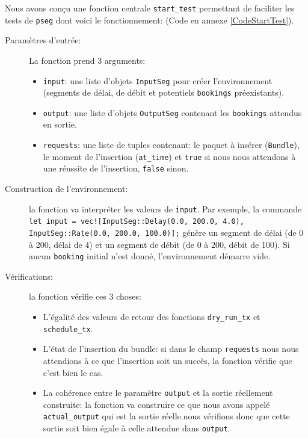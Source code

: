 \documentclass{article}
\begin{document}
Nous avons conçu une fonction centrale \texttt{start\_test} permettant de faciliter les tests de \texttt{pseg} dont voici le fonctionnement: \label{pseg} (Code en annexe \ref{CodeStartTest}).
\begin{description}
    \item[Paramètres d'entrée: ] La fonction prend 3 arguments:
    \begin{itemize}
        \item \texttt{input}: une liste d'objets \texttt{InputSeg} pour créer l'environnement (segments de délai, de débit et potentiels \texttt{bookings} préexistants).
        \item \texttt{output}: une liste d'objets \texttt{OutputSeg} contenant les \texttt{bookings} attendus en sortie.
        \item \texttt{requests}: une liste de tuples contenant: le paquet à insérer (\texttt{Bundle}), le moment de l'insertion (\texttt{at\_time}) et \texttt{true} si nous nous attendons à une réussite de l'insertion, \texttt{false} sinon.
    \end{itemize} 
    \item[Construction de l'environnement: ] la fonction va interpréter les valeurs de \texttt{input}. Par exemple, la commande \texttt{let input = vec![InputSeg::Delay(0.0, 200.0, 4.0), InputSeg::Rate(0.0, 200.0, 100.0)];} génère un segment de délai (de 0 à 200, délai de 4) et un segment de débit (de 0 à 200, débit de 100). Si aucun \texttt{booking} initial n'est donné, l'environnement démarre vide.
    \item[Vérifications: ] la fonction vérifie ces 3 choses:
    \begin{itemize}
        \item L'égalité des valeurs de retour des fonctions \texttt{dry\_run\_tx} et \texttt{schedule\_tx}.
        \item L'état de l'insertion du bundle: si dans le champ \texttt{requests} nous nous attendions à ce que l'insertion soit un succès, la fonction vérifie que c'est bien le cas.
        \item La cohérence entre le paramètre \texttt{output} et la sortie réellement construite: la fonction va construire ce que nous avons appelé \texttt{actual\_output} qui est la sortie réelle.nous vérifions donc que cette sortie soit bien égale à celle attendue dans \texttt{output}.
    \end{itemize}
\end{description}
\end{document}

